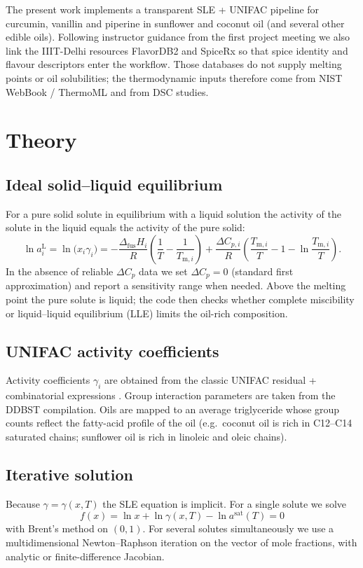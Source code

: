 \documentclass[twocolumn,10pt]{article}
\begin{document}
The present work implements a transparent SLE + UNIFAC pipeline for curcumin, vanillin and piperine in sunflower and coconut oil (and several other edible oils). Following instructor guidance from the first project meeting we also link the IIIT-Delhi resources FlavorDB2 and SpiceRx \citep{garg2018flavordb,goel2024flavordb2,rakhi2018spicerx} so that spice identity and flavour descriptors enter the workflow. Those databases do not supply melting points or oil solubilities; the thermodynamic inputs therefore come from NIST WebBook / ThermoML and from DSC studies.

\section{Theory}

\subsection{Ideal solid--liquid equilibrium}
For a pure solid solute in equilibrium with a liquid solution the activity of the solute in the liquid equals the activity of the pure solid:
\begin{equation}
\ln a_i^{\mathrm{L}} = \ln\bigl(x_i\gamma_i\bigr)
= -\frac{\Delta_{\mathrm{fus}}H_i}{R}\left(\frac{1}{T}-\frac{1}{T_{\mathrm{m},i}}\right)
+ \frac{\Delta C_{p,i}}{R}\left(\frac{T_{\mathrm{m},i}}{T}-1-\ln\frac{T_{\mathrm{m},i}}{T}\right).
\label{eq:sle}
\end{equation}
In the absence of reliable $\Delta C_p$ data we set $\Delta C_p=0$ (standard first approximation) and report a sensitivity range when needed. Above the melting point the pure solute is liquid; the code then checks whether complete miscibility or liquid--liquid equilibrium (LLE) limits the oil-rich composition.

\subsection{UNIFAC activity coefficients}
Activity coefficients $\gamma_i$ are obtained from the classic UNIFAC residual + combinatorial expressions \citep{fredenslund1975unifac}. Group interaction parameters are taken from the DDBST compilation. Oils are mapped to an average triglyceride whose group counts reflect the fatty-acid profile of the oil (e.g.\ coconut oil is rich in C12--C14 saturated chains; sunflower oil is rich in linoleic and oleic chains).

\subsection{Iterative solution}
Because $\gamma=\gamma(x,T)$ the SLE equation is implicit. For a single solute we solve
\begin{equation}
f(x)=\ln x + \ln\gamma(x,T) - \ln a^{\mathrm{sat}}(T)=0
\end{equation}
with Brent's method on $(0,1)$. For several solutes simultaneously we use a multidimensional Newton--Raphson iteration on the vector of mole fractions, with analytic or finite-difference Jacobian.
\end{document}
